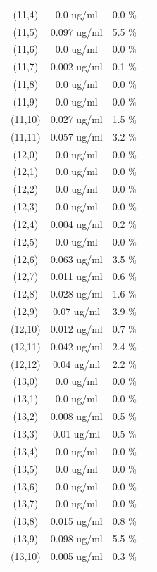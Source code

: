 \documentclass{article}
\begin{document}
\begin{tabular}{c c c c}
(11,4)&        0.0 ug/ml        &0.0 \%\\
(11,5)&        0.097 ug/ml        &5.5 \%\\
(11,6)&        0.0 ug/ml        &0.0 \%\\
(11,7)&        0.002 ug/ml        &0.1 \%\\
(11,8)&        0.0 ug/ml        &0.0 \%\\
(11,9)&        0.0 ug/ml        &0.0 \%\\
(11,10)&        0.027 ug/ml        &1.5 \%\\
(11,11)&        0.057 ug/ml        &3.2 \%\\
(12,0)&        0.0 ug/ml        &0.0 \%\\
(12,1)&        0.0 ug/ml        &0.0 \%\\
(12,2)&        0.0 ug/ml        &0.0 \%\\
(12,3)&        0.0 ug/ml        &0.0 \%\\
(12,4)&        0.004 ug/ml        &0.2 \%\\
(12,5)&        0.0 ug/ml        &0.0 \%\\
(12,6)&        0.063 ug/ml        &3.5 \%\\
(12,7)&        0.011 ug/ml        &0.6 \%\\
(12,8)&        0.028 ug/ml        &1.6 \%\\
(12,9)&        0.07 ug/ml        &3.9 \%\\
(12,10)&        0.012 ug/ml        &0.7 \%\\
(12,11)&        0.042 ug/ml        &2.4 \%\\
(12,12)&        0.04 ug/ml        &2.2 \%\\
(13,0)&        0.0 ug/ml        &0.0 \%\\
(13,1)&        0.0 ug/ml        &0.0 \%\\
(13,2)&        0.008 ug/ml        &0.5 \%\\
(13,3)&        0.01 ug/ml        &0.5 \%\\
(13,4)&        0.0 ug/ml        &0.0 \%\\
(13,5)&        0.0 ug/ml        &0.0 \%\\
(13,6)&        0.0 ug/ml        &0.0 \%\\
(13,7)&        0.0 ug/ml        &0.0 \%\\
(13,8)&        0.015 ug/ml        &0.8 \%\\
(13,9)&        0.098 ug/ml        &5.5 \%\\
(13,10)&        0.005 ug/ml        &0.3 \%\\

\end{tabular}
\end{document}
